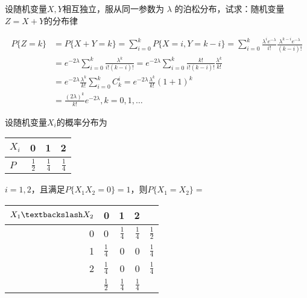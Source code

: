 \documentclass{article}
\begin{document}
\begin{examplle}[]
设随机变量\(X,Y\)相互独立，服从同一参数为 \(\lambda\) 的泊松分布，试求：随机变量
\(Z=X+Y\)的分布律

\begin{align*}
P\{Z=k\}&=P\{X+Y=k\}=\sum_{i=0}^kP\{X=i,Y=k-i\}=\sum_{i=0}^k
\frac{\lambda^i e^{-\lambda}}{i!}\frac{\lambda^{k-i}e^{-\lambda}}{(k-i)!}\\
&=e^{-2\lambda}\sum_{i=0}^k\frac{\lambda^k}{i!(k-i)!}=e^{-2\lambda}\sum_{i=0}^k
\frac{k!}{i!(k-i)!}\frac{\lambda^k}{k!}\\
&=e^{-2\lambda}\frac{\lambda^k}{k!}\sum_{i=0}^kC_k^i=e^{-2\lambda}\frac{\lambda^k}{k!}(1+1)^k\\
&=\frac{(2\lambda)^k}{k!}e^{-2\lambda},k=0,1,\dots
\end{align*}
\end{examplle}

\begin{examplle}[]
设随机变量\(X_i\)的概率分布为
\begin{center}
\begin{tabular}{l|rrr}
\(X_i\) & 0 & 1 & 2\\
\hline
\(P\) & \(\frac{1}{2}\) & \(\frac{1}{4}\) & \(\frac{1}{4}\)\\
\end{tabular}
\end{center}
\(i=1,2\)，且满足\(P\{X_1X_2=0\}=1\)，则\(P\{X_1=X_2\}=\)

\begin{center}
\begin{tabular}{r|lrr|l}
\(X_1\textbackslash X_2\) & 0 & 1 & 2 & \\
\hline
0 & 0 & \(\frac{1}{4}\) & \(\frac{1}{4}\) & \(\frac{1}{2}\)\\
1 & \(\frac{1}{4}\) & 0 & 0 & \(\frac{1}{4}\)\\
2 & \(\frac{1}{4}\) & 0 & 0 & \(\frac{1}{4}\)\\
\hline
 & \(\frac{1}{2}\) & \(\frac{1}{4}\) & \(\frac{1}{4}\) & \\
\end{tabular}
\end{center}
\end{examplle}
\end{document}
